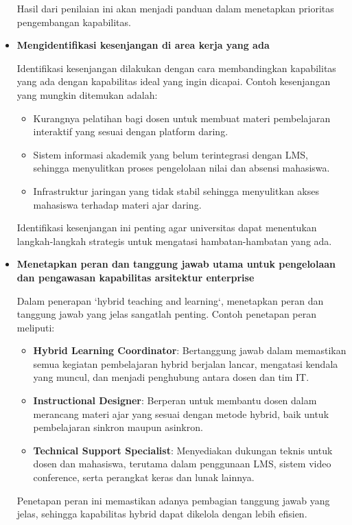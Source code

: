 \begin{itemize}
	Hasil dari penilaian ini akan menjadi panduan dalam menetapkan prioritas pengembangan kapabilitas.
	
	\item \textbf{Mengidentifikasi kesenjangan di area kerja yang ada}
	
	Identifikasi kesenjangan dilakukan dengan cara membandingkan kapabilitas yang ada dengan kapabilitas ideal yang ingin dicapai. Contoh kesenjangan yang mungkin ditemukan adalah:
	\begin{itemize}
		\item Kurangnya pelatihan bagi dosen untuk membuat materi pembelajaran interaktif yang sesuai dengan platform daring.
		\item Sistem informasi akademik yang belum terintegrasi dengan LMS, sehingga menyulitkan proses pengelolaan nilai dan absensi mahasiswa.
		\item Infrastruktur jaringan yang tidak stabil sehingga menyulitkan akses mahasiswa terhadap materi ajar daring.
	\end{itemize}
	
	Identifikasi kesenjangan ini penting agar universitas dapat menentukan langkah-langkah strategis untuk mengatasi hambatan-hambatan yang ada.
	
	\item \textbf{Menetapkan peran dan tanggung jawab utama untuk pengelolaan dan pengawasan kapabilitas arsitektur enterprise}
	
	Dalam penerapan `hybrid teaching and learning`, menetapkan peran dan tanggung jawab yang jelas sangatlah penting. Contoh penetapan peran meliputi:
	\begin{itemize}
		\item \textbf{Hybrid Learning Coordinator}: Bertanggung jawab dalam memastikan semua kegiatan pembelajaran hybrid berjalan lancar, mengatasi kendala yang muncul, dan menjadi penghubung antara dosen dan tim IT.
		\item \textbf{Instructional Designer}: Berperan untuk membantu dosen dalam merancang materi ajar yang sesuai dengan metode hybrid, baik untuk pembelajaran sinkron maupun asinkron.
		\item \textbf{Technical Support Specialist}: Menyediakan dukungan teknis untuk dosen dan mahasiswa, terutama dalam penggunaan LMS, sistem video conference, serta perangkat keras dan lunak lainnya.
	\end{itemize}
	
	Penetapan peran ini memastikan adanya pembagian tanggung jawab yang jelas, sehingga kapabilitas hybrid dapat dikelola dengan lebih efisien.
	

\end{itemize}
